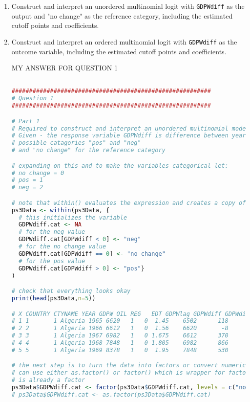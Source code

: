 \documentclass[12pt,letterpaper]{article}
\begin{document}
\begin{enumerate}
	\item Construct and interpret an unordered multinomial logit with \texttt{GDPWdiff} as the output and "no change" as the reference category, including the estimated cutoff points and coefficients.
	\item Construct and interpret an ordered multinomial logit with \texttt{GDPWdiff} as the outcome variable, including the estimated cutoff points and coefficients.
	
	
\noindent MY ANSWER FOR QUESTION 1


\begin{lstlisting}[language=R]

#########################################################
# Question 1
#########################################################

# Part 1
# Required to construct and interpret an unordered multinomial model
# Given - the response variable GDPWdiff is difference between year t and t-1 
# possible catagories "pos" and "neg" 
# and "no change" for the reference category 

# expanding on this and to make the variables categorical let:
# no change = 0
# pos = 1
# neg = 2

# note that within() evaluates the expression and creates a copy of the original data frame ps3Data
ps3Data <- within(ps3Data, {   
  # this initializes the variable
  GDPWdiff.cat <- NA 
  # for the neg value
  GDPWdiff.cat[GDPWdiff < 0] <- "neg"
  # for the no change value
  GDPWdiff.cat[GDPWdiff == 0] <- "no change"
  # for the pos value
  GDPWdiff.cat[GDPWdiff > 0] <- "pos"}
)

# check that everything looks okay 
print(head(ps3Data,n=5))

# X COUNTRY CTYNAME YEAR GDPW OIL REG   EDT GDPWlag GDPWdiff GDPWdifflag GDPWdifflag2 GDPWdiff.cat
# 1 1       1 Algeria 1965 6620   1   0  1.45    6502      118         419         1071          pos
# 2 2       1 Algeria 1966 6612   1   0  1.56    6620       -8         118          419          neg
# 3 3       1 Algeria 1967 6982   1   0 1.675    6612      370          -8          118          pos
# 4 4       1 Algeria 1968 7848   1   0 1.805    6982      866         370           -8          pos
# 5 5       1 Algeria 1969 8378   1   0  1.95    7848      530         866          370          pos

# the next step is to turn the data into factors or convert numeric to a factor
# can use either as.factor() or factor() which is wrapper for factor but allows quick return if the input factor 
# is already a factor
ps3Data$GDPWdiff.cat <- factor(ps3Data$GDPWdiff.cat, levels = c("no change", "pos", "neg"))
# ps3Data$GDPWdiff.cat <- as.factor(ps3Data$GDPWdiff.cat)


\end{lstlisting}
\end{enumerate}
\end{document}
